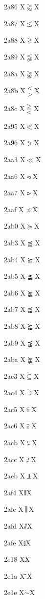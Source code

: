 \documentclass[11pt]{article}
\begin{document}
2a86 X{\ensuremath{\gtrapprox}}X

2a87 X{\ensuremath{\lneq}}X

2a88 X{\ensuremath{\gneq}}X

2a89 X{\ensuremath{\lnapprox}}X

2a8a X{\ensuremath{\gnapprox}}X

2a8b X{\ensuremath{\lesseqqgtr}}X

2a8c X{\ensuremath{\gtreqqless}}X

2a95 X{\ensuremath{\eqslantless}}X

2a96 X{\ensuremath{\eqslantgtr}}X

2aa3 X{\ensuremath{\underline{\ll}}}X

2aa6 X{\ensuremath{\leftslice}}X

2aa7 X{\ensuremath{\rightslice}}X

2aaf X{\ensuremath{\preceq}}X

2ab0 X{\ensuremath{\succeq}}X

2ab3 X{\ensuremath{\preceqq}}X

2ab4 X{\ensuremath{\succeqq}}X

2ab5 X{\ensuremath{\precneqq}}X

2ab6 X{\ensuremath{\succneqq}}X

2ab7 X{\ensuremath{\precapprox}}X

2ab8 X{\ensuremath{\succapprox}}X

2ab9 X{\ensuremath{\precnapprox}}X

2aba X{\ensuremath{\succnapprox}}X

2ac3 X{\ensuremath{\dot{\subseteq}}}X

2ac4 X{\ensuremath{\dot{\supseteq}}}X

2ac5 X{\ensuremath{\subseteqq}}X

2ac6 X{\ensuremath{\supseteqq}}X

2acb X{\ensuremath{\subsetneqq}}X

2acc X{\ensuremath{\supsetneqq}}X

2aeb X{\ensuremath{\Perp}}X

2af4 X{\ensuremath{\interleave}}X

2afc X{\ensuremath{\biginterleave}}X

2afd X{\ensuremath{\sslash}}X

2afe X{\ensuremath{\talloblong}}X

2e18 X{\textinterrobangdown}X

2e1a X{\"{-}}X

2e1e X{\ensuremath{\dot{\sim}}}X
\end{document}
